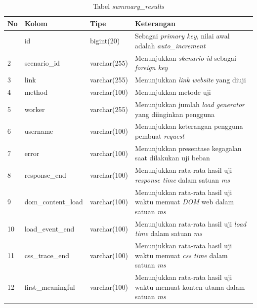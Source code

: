 				\begin{longtable}{|p{}|p{}|p{}|p{}|}
					\caption{Tabel \textit{summary\_results}} \label{tabelsumresults} \\
					\hline
					\textbf{No} & \textbf{Kolom} & \textbf{Tipe} & \textbf{Keterangan} \\ \hline
					\endhead
					\endfoot
					\endlastfoot
					1 & id & bigint(20) & Sebagai \textit{primary key}, nilai awal adalah \textit{auto\_increment} \\ \hline
					2 & scenario\_id & varchar(255) & Menunjukkan \textit{skenario id} sebagai \textit{foreign key} \\ \hline
					3 & link & varchar(255) & Menunjukkan \textit{link website} yang diuji \\ \hline
					4 & method & varchar(100) & Menunjukkan metode uji \\ \hline
					5 & worker & varchar(255) & Menunjukkan jumlah \textit{load generator} yang diinginkan pengguna \\ \hline
					6 & username & varchar(100) & Menunjukkan keterangan pengguna pembuat \textit{request} \\ \hline
					7 & error & varchar(100) & Menunjukkan presentase kegagalan saat dilakukan uji beban \\ \hline
					8 & response\_end & varchar(100) & Menunjukkan rata-rata hasil uji \textit{response time} dalam satuan \textit{ms} \\ \hline
					9 & dom\_content\_load & varchar(100) & Menunjukkan rata-rata hasil uji waktu memuat \textit{DOM} web dalam satuan \textit{ms} \\ \hline
					10 & load\_event\_end & varchar(100) & Menunjukkan rata-rata hasil uji \textit{load time} dalam satuan \textit{ms} \\ \hline
					11 & css\_trace\_end & varchar(100) & Menunjukkan rata-rata hasil uji waktu memuat \textit{css time} dalam satuan \textit{ms} \\ \hline
					12 & first\_meaningful & varchar(100) & Menunjukkan rata-rata hasil uji waktu memuat konten utama dalam satuan \textit{ms} \\ \hline
				\end{longtable}
			
